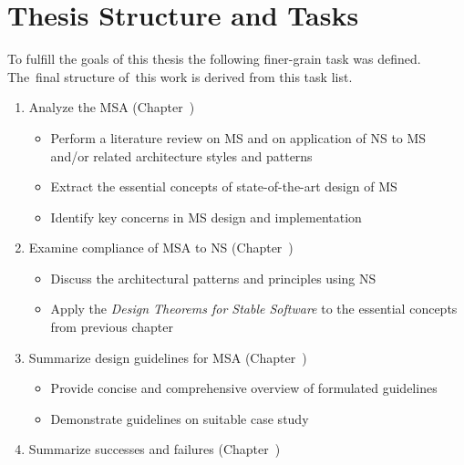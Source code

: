 \documentclass[thesis=M,english,hidelinks]{FITthesis}[2012/10/20]
\begin{document}
\section{Thesis Structure and Tasks}
To fulfill the goals of this thesis the following finer-grain task was defined. The~final structure of~this work is derived from this task list.
\begin{enumerate}

	\item Analyze the \acrlong{MSA} (Chapter~\textit{})
	\begin{itemize}
		\item Perform a literature review on \acrshort{MS} and on application of \acrshort{NS} to \acrshort{MS} and/or related architecture styles and patterns
        \item Extract the essential concepts of state-of-the-art design of \acrshort{MS}
		\item Identify key concerns in \acrshort{MS} design and implementation
	\end{itemize}

	\item Examine compliance of \acrlong{MSA} to \acrlong{NS} (Chapter~\textit{})
	\begin{itemize}
		\item Discuss the architectural patterns and principles using \acrlong{NS}
		\item Apply the \textit{Design Theorems for Stable Software} \cite{ns-towards-evolvable} to the essential concepts from previous chapter
	\end{itemize}	

	\item Summarize design guidelines for \acrshort{MSA} (Chapter~\textit{})
	\begin{itemize}
		\item Provide concise and comprehensive overview of formulated guidelines
		\item Demonstrate guidelines on suitable case study
	\end{itemize}
	
	\item Summarize successes and failures (Chapter~\textit{})
\end{enumerate}
\end{document}
